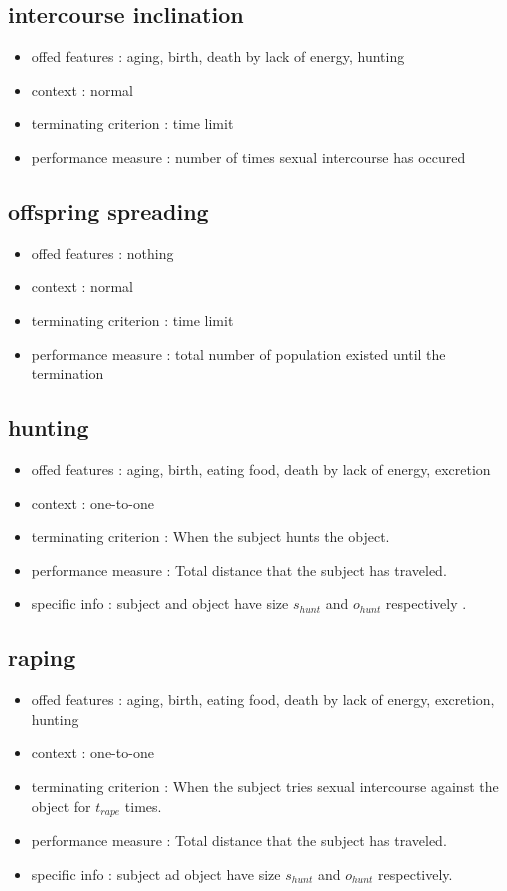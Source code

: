 \documentclass{amsart}
\theoremstyle{definition}
\theoremstyle{remark}
\numberwithin{equation}{section}
\begin{document}
\subsection{intercourse inclination}
\begin{itemize}
\item offed features : aging, birth, death by lack of energy, hunting 
\item context : normal
\item terminating criterion : time limit
\item performance measure : number of times sexual intercourse has occured 
\end{itemize}

\subsection{offspring spreading}
\begin{itemize}
\item offed features : nothing 
\item context : normal 
\item terminating criterion : time limit 
\item performance measure : total number of population existed until the termination 
\end{itemize}

\subsection{hunting}
\begin{itemize}
\item offed features : aging, birth, eating food, death by lack of energy, excretion 
\item context : one-to-one
\item terminating criterion : When the subject hunts the object.
\item performance measure : Total distance that the subject has traveled.
\item specific info : subject and object have size $s_{hunt}$ and $o_{hunt}$ respectively .
\end{itemize}

\subsection{raping}
\begin{itemize}
\item offed features : aging, birth, eating food, death by lack of energy, excretion, hunting
\item context : one-to-one
\item terminating criterion : When the subject tries sexual intercourse against the object for $t_{rape}$ times.
\item performance measure : Total distance that the subject has traveled.
\item specific info : subject ad object have size $s_{hunt}$ and $o_{hunt}$ respectively. 
\end{itemize}
\end{document}
